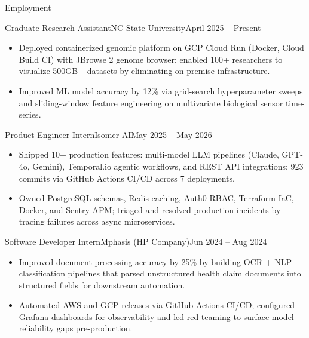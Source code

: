 \documentclass[]{mcdowellcv}
\begin{document}
\makeheader

\begin{cvsection}{Employment}
  \begin{cvsubsection}{Graduate Research Assistant}{NC State University}{April 2025 -- Present}
    \begin{itemize}
      \item Deployed containerized genomic platform on GCP Cloud Run (Docker, Cloud Build CI) with JBrowse 2 genome browser; enabled 100+ researchers to visualize 500GB+ datasets by eliminating on-premise infrastructure.
      \item Improved ML model accuracy by 12\% via grid-search hyperparameter sweeps and sliding-window feature engineering on multivariate biological sensor time-series.
    \end{itemize}
    \vspace{-1.5pt}
  \end{cvsubsection}

  \begin{cvsubsection}{Product Engineer Intern}{Isomer AI}{May 2025 -- May 2026}
    \begin{itemize}
      \item Shipped 10+ production features: multi-model LLM pipelines (Claude, GPT-4o, Gemini), Temporal.io agentic workflows, and REST API integrations; 923 commits via GitHub Actions CI/CD across 7 deployments.
      \item Owned PostgreSQL schemas, Redis caching, Auth0 RBAC, Terraform IaC, Docker, and Sentry APM; triaged and resolved production incidents by tracing failures across async microservices.
    \end{itemize}
    \vspace{-1.5pt}
  \end{cvsubsection}

  \begin{cvsubsection}{Software Developer Intern}{Mphasis (HP Company)}{Jun 2024 -- Aug 2024}
    \begin{itemize}
      \item Improved document processing accuracy by 25\% by building OCR + NLP classification pipelines that parsed unstructured health claim documents into structured fields for downstream automation.
      \item Automated AWS and GCP releases via GitHub Actions CI/CD; configured Grafana dashboards for observability and led red-teaming to surface model reliability gaps pre-production.
    \end{itemize}
    \vspace{-1.5pt}
  \end{cvsubsection}


\end{cvsection}
\end{document}
